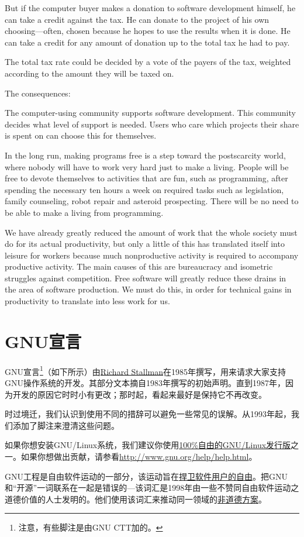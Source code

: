 But if the computer buyer makes a donation to software development himself, he can take a credit against the tax. He can donate to the project of his own choosing—often, chosen because he hopes to use the results when it is done. He can take a credit for any amount of donation up to the total tax he had to pay.

The total tax rate could be decided by a vote of the payers of the tax, weighted according to the amount they will be taxed on.

The consequences:

The computer-using community supports software development.
This community decides what level of support is needed.
Users who care which projects their share is spent on can choose this for themselves.

In the long run, making programs free is a step toward the postscarcity world, where nobody will have to work very hard just to make a living. People will be free to devote themselves to activities that are fun, such as programming, after spending the necessary ten hours a week on required tasks such as legislation, family counseling, robot repair and asteroid prospecting. There will be no need to be able to make a living from programming.

We have already greatly reduced the amount of work that the whole society must do for its actual productivity, but only a little of this has translated itself into leisure for workers because much nonproductive activity is required to accompany productive activity. The main causes of this are bureaucracy and isometric struggles against competition. Free software will greatly reduce these drains in the area of software production. We must do this, in order for technical gains in productivity to translate into less work for us.
\chapter{GNU宣言}
GNU宣言\footnote{注意，有些脚注是由GNU CTT加的。}（如下所示）由\href{http://www.stallman.org/}{Richard Stallman}在1985年撰写，用来请求大家支持GNU操作系统的开发。其部分文本摘自1983年撰写的初始声明。直到1987年，因为开发的原因它时时小有更改；那时起，看起来最好是保持它不再改变。\par
时过境迁，我们认识到使用不同的措辞可以避免一些常见的误解。从1993年起，我们添加了脚注来澄清这些问题。\par
如果你想安装GNU/Linux系统，我们建议你使用\href{http://www.gnu.org/distros}{100\%自由的GNU/Linux发行版}之一。如果你想做出贡献，请参看\url{http://www.gnu.org/help/help.html}。\par
GNU工程是自由软件运动的一部分，该运动旨在\href{http://www.gnu.org/philosophy/free-sw.html}{捍卫软件用户的自由}。把GNU和“开源”一词联系在一起是错误的—该词汇是1998年由一些不赞同自由软件运动之道德价值的人士发明的。他们使用该词汇来推动同一领域的\href{http://www.gnu.org/philosophy/open-source-misses-the-point.html}{非道德方案}。\par
